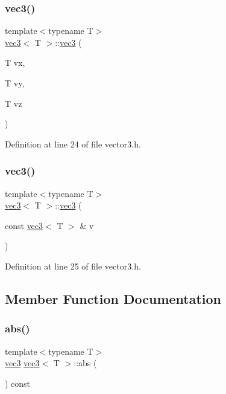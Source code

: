 \subsubsection{\texorpdfstring{vec3()}{vec3()}\hspace{0.1cm}{\footnotesize\ttfamily [2/3]}}
{\footnotesize\ttfamily template$<$typename T$>$ \\
\mbox{\hyperlink{structvec3}{vec3}}$<$ T $>$\+::\mbox{\hyperlink{structvec3}{vec3}} (\begin{DoxyParamCaption}\item[{T}]{vx,  }\item[{T}]{vy,  }\item[{T}]{vz }\end{DoxyParamCaption})\hspace{0.3cm}{\ttfamily [inline]}}



Definition at line 24 of file vector3.\+h.

\mbox{\label{structvec3_ac0d73cf98ccc9b3cb39e6f58e92dab9f}} 
\subsubsection{\texorpdfstring{vec3()}{vec3()}\hspace{0.1cm}{\footnotesize\ttfamily [3/3]}}
{\footnotesize\ttfamily template$<$typename T$>$ \\
\mbox{\hyperlink{structvec3}{vec3}}$<$ T $>$\+::\mbox{\hyperlink{structvec3}{vec3}} (\begin{DoxyParamCaption}\item[{const \mbox{\hyperlink{structvec3}{vec3}}$<$ T $>$ \&}]{v }\end{DoxyParamCaption})\hspace{0.3cm}{\ttfamily [inline]}}



Definition at line 25 of file vector3.\+h.



\subsection{Member Function Documentation}
\mbox{\label{structvec3_abf0d30ac0a81beeacd36ddc86ec6ee83}} 
\subsubsection{\texorpdfstring{abs()}{abs()}}
{\footnotesize\ttfamily template$<$typename T$>$ \\
\mbox{\hyperlink{structvec3}{vec3}} \mbox{\hyperlink{structvec3}{vec3}}$<$ T $>$\+::abs (\begin{DoxyParamCaption}{ }\end{DoxyParamCaption}) const\hspace{0.3cm}{\ttfamily [inline]}}



